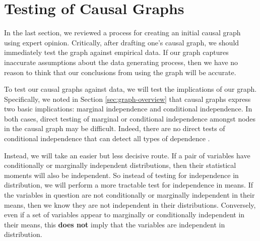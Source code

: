 \section{Testing of Causal Graphs}

In the last section, we reviewed a process for creating an initial causal graph using expert opinion.
Critically, after drafting one's causal graph, we should immediately test the graph against empirical data.
If our graph captures inaccurate assumptions about the data generating process, then we have no reason to think that our conclusions from using the graph will be accurate.

To test our causal graphs against data, we will test the implications of our graph.
Specifically, we noted in Section \ref{sec:graph-overview} that causal graphs express two basic implications: marginal independence and conditional independence.
In both cases, direct testing of marginal or conditional independence amongst nodes in the causal graph may be difficult.
Indeed, there are no direct tests of conditional independence that can detect all types of dependence \citep{shah_2020_hardness}.

Instead, we will take an easier but less decisive route.
If a pair of variables have conditionally or marginally independent distributions, then their statistical moments will also be independent.
So instead of testing for independence in distribution, we will perform a more tractable test for independence in means.
If the variables in question are not conditionally or marginally independent in their means, then we know they are not independent in their distributions.
Conversely, even if a set of variables appear to marginally or conditionally independent in their means, this \textbf{does not} imply that the variables are independent in distribution.
